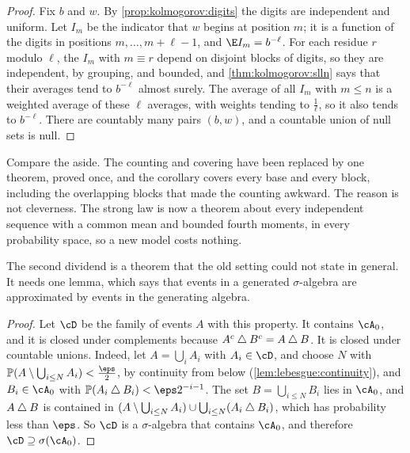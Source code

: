 \begin{refsection}
\begin{proof}
Fix $b$ and $w$. By \cref{prop:kolmogorov:digits} the digits are independent and uniform. Let $I_m$ be the indicator that $w$ begins at position $m$; it is a function of the digits in positions $m,\dots,m+\ell-1$, and $\E I_m=b^{-\ell}$. For each residue $r$ modulo $\ell$, the $I_m$ with $m\equiv r$ depend on disjoint blocks of digits, so they are independent, by grouping, and bounded, and \cref{thm:kolmogorov:slln} says that their averages tend to $b^{-\ell}$ almost surely. The average of all $I_m$ with $m\le n$ is a weighted average of these $\ell$ averages, with weights tending to $\frac1\ell$, so it also tends to $b^{-\ell}$. There are countably many pairs $(b,w)$, and a countable union of null sets is null.
\end{proof}

Compare the aside. The counting and covering have been replaced by one theorem, proved once, and the corollary covers every base and every block, including the overlapping blocks that made the counting awkward. The reason is not cleverness. The strong law is now a theorem about every independent sequence with a common mean and bounded fourth moments, in every probability space, so a new model costs nothing.

The second dividend is a theorem that the old setting could not state in general. It needs one lemma, which says that events in a generated $\sigma$-algebra are approximated by events in the generating algebra.


\begin{proof}
Let $\cD$ be the family of events $A$ with this property. It contains $\cA_0$, and it is closed under complements because $A^c\mathbin{\triangle} B^c=A\mathbin{\triangle} B$. It is closed under countable unions. Indeed, let $A=\bigcup_iA_i$ with $A_i\in\cD$, and choose $N$ with $\kolP(A\setminus\bigcup_{i\le N}A_i)<\frac\eps2$, by continuity from below (\cref{lem:lebesgue:continuity}), and $B_i\in\cA_0$ with $\kolP(A_i\kolsymdiff B_i)<\eps2^{-i-1}$. The set $B=\bigcup_{i\le N}B_i$ lies in $\cA_0$, and $A\mathbin{\triangle} B$ is contained in $(A\setminus\bigcup_{i\le N}A_i)\cup\bigcup_{i\le N}(A_i\mathbin{\triangle} B_i)$, which has probability less than $\eps$. So $\cD$ is a $\sigma$-algebra that contains $\cA_0$, and therefore $\cD\supseteq\sigma(\cA_0)$.
\end{proof}


\end{refsection}
